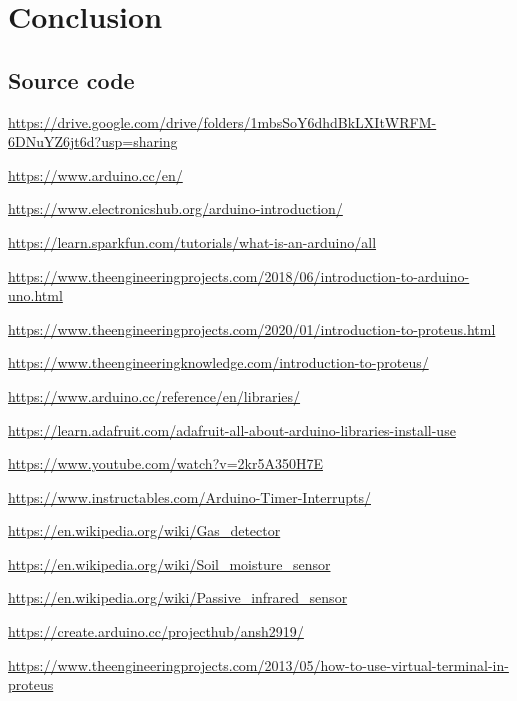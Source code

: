 \documentclass[a4paper]{article}
\begin{document}
\section{Conclusion}
\subsection{Source code}
\url{https://drive.google.com/drive/folders/1mbsSoY6dhdBkLXItWRFM-6DNuYZ6jt6d?usp=sharing}

\newpage
{}

\begin{thebibliography}{80}


\url{https://www.arduino.cc/en/}

\url{https://www.electronicshub.org/arduino-introduction/}

\url{https://learn.sparkfun.com/tutorials/what-is-an-arduino/all}

\url{https://www.theengineeringprojects.com/2018/06/introduction-to-arduino-uno.html}

\url{https://www.theengineeringprojects.com/2020/01/introduction-to-proteus.html}

\url{https://www.theengineeringknowledge.com/introduction-to-proteus/}

\url{https://www.arduino.cc/reference/en/libraries/}

\url{https://learn.adafruit.com/adafruit-all-about-arduino-libraries-install-use}

\url{https://www.youtube.com/watch?v=2kr5A350H7E}

\url{https://www.instructables.com/Arduino-Timer-Interrupts/}

\url{https://en.wikipedia.org/wiki/Gas_detector}

\url{https://en.wikipedia.org/wiki/Soil_moisture_sensor}

\url{https://en.wikipedia.org/wiki/Passive_infrared_sensor}

\url{https://create.arduino.cc/projecthub/ansh2919/}

\url{https://www.theengineeringprojects.com/2013/05/how-to-use-virtual-terminal-in-proteus}

\end{thebibliography}
\end{document}
